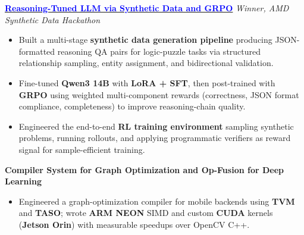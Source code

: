 \documentclass[10pt,a4]{article}
\begin{document}
{\begin{flushleft}

        \item \hspace{1.5mm} \textbf{\large \href{https://blog.narain.dev/posts/synthetic-data-hackathon/}{\textcolor{blue}{Reasoning-Tuned LLM via Synthetic Data and GRPO}}} \hfill \textit{Winner, AMD Synthetic Data Hackathon}

        \vspace{0.25mm}
        \begin{itemize}
            \item Built a multi-stage \textbf{synthetic data generation pipeline} producing JSON-formatted reasoning QA pairs for logic-puzzle tasks via structured relationship sampling, entity assignment, and bidirectional validation.
            \item Fine-tuned \textbf{Qwen3 14B} with \textbf{LoRA + SFT}, then post-trained with \textbf{GRPO} using weighted multi-component rewards (correctness, JSON format compliance, completeness) to improve reasoning-chain quality.
            \item Engineered the end-to-end \textbf{RL training environment} \textendash{} sampling synthetic problems, running rollouts, and applying programmatic verifiers as reward signal for sample-efficient training.
        \end{itemize}
        \item \hspace{1.5mm} \textbf{\large Compiler System for Graph Optimization and Op-Fusion for Deep Learning}
        \vspace{0.25mm}
        \begin{itemize}
            \item Engineered a graph-optimization compiler for mobile backends using \textbf{TVM} and \textbf{TASO}; wrote \textbf{ARM NEON} SIMD and custom \textbf{CUDA} kernels (\textbf{Jetson Orin}) with measurable speedups over OpenCV C++.
        \end{itemize}


\end{flushleft}


}
\end{document}
